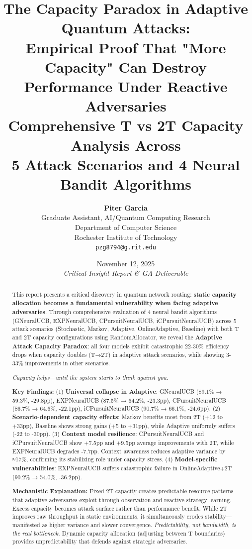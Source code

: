 \documentclass[11pt,a4paper]{article}
\title{
\vspace{-1.5cm}
\textbf{\LARGE The Capacity Paradox in Adaptive Quantum Attacks:} \\
\vspace{0.4cm}
\textbf{\Large Empirical Proof That "More Capacity" Can Destroy Performance Under Reactive Adversaries} \\
\vspace{0.6cm}
\large Comprehensive T vs 2T Capacity Analysis Across \\
5 Attack Scenarios and 4 Neural Bandit Algorithms
}
\author{
\textbf{Piter Garcia} \\
Graduate Assistant, AI/Quantum Computing Research \\
Department of Computer Science \\
Rochester Institute of Technology \\
\texttt{pzg8794@g.rit.edu}
}
\date{
November 12, 2025 \\
\vspace{0.3cm}
\textit{Critical Insight Report \& GA Deliverable}
}
\newcommand{\critical}[1]{\textcolor{criticalcolor}{\textbf{#1}}}
\begin{document}
\maketitle

\begin{abstract}
This report presents a critical discovery in quantum network routing: \textbf{static capacity allocation becomes a fundamental vulnerability when facing adaptive adversaries}. Through comprehensive evaluation of 4 neural bandit algorithms (GNeuralUCB, EXPNeuralUCB, CPursuitNeuralUCB, iCPursuitNeuralUCB) across 5 attack scenarios (Stochastic, Markov, Adaptive, OnlineAdaptive, Baseline) with both T and 2T capacity configurations using RandomAllocator, we reveal the \critical{Adaptive Attack Capacity Paradox}: all four models exhibit catastrophic 22-30\% efficiency drops when capacity doubles (T→2T) in adaptive attack scenarios, while showing 3-33\% improvements in other scenarios.

\textit{Capacity helps—until the system starts to think against you.}

\textbf{Key Findings:} (1) \textbf{Universal collapse in Adaptive}: GNeuralUCB (89.1\% → 59.3\%, -29.8pp), EXPNeuralUCB (87.5\% → 64.2\%, -23.3pp), CPursuitNeuralUCB (86.7\% → 64.6\%, -22.1pp), iCPursuitNeuralUCB (90.7\% → 66.1\%, -24.6pp). (2) \textbf{Scenario-dependent capacity effects}: Markov benefits most from 2T (+12 to +33pp), Baseline shows strong gains (+5 to +31pp), while Adaptive uniformly suffers (-22 to -30pp). (3) \textbf{Context model resilience}: CPursuitNeuralUCB and iCPursuitNeuralUCB show +7.5pp and +9.5pp average improvements with 2T, while EXPNeuralUCB degrades -7.7pp. Context awareness reduces adaptive variance by ≈17\%, confirming its stabilizing role under capacity stress. (4) \textbf{Model-specific vulnerabilities}: EXPNeuralUCB suffers catastrophic failure in OnlineAdaptive+2T (90.2\% → 54.0\%, -36.2pp).

\textbf{Mechanistic Explanation:} Fixed 2T capacity creates predictable resource patterns that adaptive adversaries exploit through observation and reactive strategy learning. Excess capacity becomes attack surface rather than performance benefit. While 2T improves raw throughput in static environments, it simultaneously erodes stability—manifested as higher variance and slower convergence. \textit{Predictability, not bandwidth, is the real bottleneck.} Dynamic capacity allocation (adjusting between T boundaries) provides unpredictability that defends against strategic adversaries.


\end{abstract}
\end{document}
